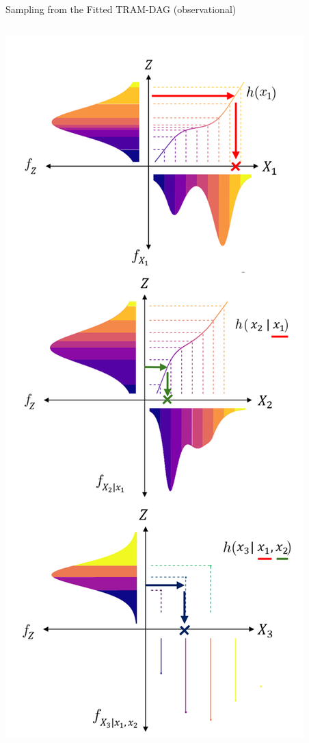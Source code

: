\documentclass[onlytextwidth,english]{beamer}\usepackage[]{graphicx}\usepackage[]{xcolor}
\begin{document}
\begin{frame}{Sampling from the Fitted TRAM-DAG (observational)}
\begin{columns}
\begin{column}{0.3\textwidth}
\includegraphics[width=0.9\linewidth]{img/Sampling.png}
\end{column}

\end{columns}

\end{frame}
\end{document}
